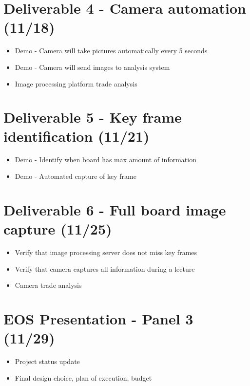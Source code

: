 \documentclass[]{article}
\begin{document}
	\section*{Deliverable 4 - Camera automation (11/18)}
	\begin{itemize}
		\item{Demo - Camera will take pictures automatically every 5 seconds}
		\item{Demo - Camera will send images to analysis system}
		\item{Image processing platform trade analysis}
	\end{itemize}
	\section*{Deliverable 5 - Key frame identification (11/21)}
	\begin{itemize}
		\item{Demo - Identify when board has max amount of information}
		\item{Demo - Automated capture of key frame}
	\end{itemize}
	\section*{Deliverable 6 - Full board image capture (11/25)}	
	\begin{itemize}
		\item{Verify that image processing server does not miss key frames}
		\item{Verify that camera captures all information during a lecture}
		\item{Camera trade analysis}
	\end{itemize}
	\section*{EOS Presentation - Panel 3 (11/29)}
		\begin{itemize}
		\item{Project status update}
		\item{Final design choice, plan of execution, budget}
	\end{itemize}
	
\end{document}

